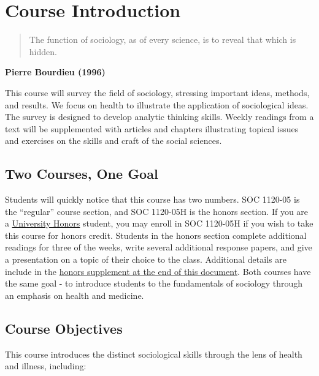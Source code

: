 \documentclass[]{book}
\theoremstyle{definition}
\theoremstyle{definition}
\theoremstyle{definition}
\theoremstyle{remark}
\begin{document}
\hypertarget{course-introduction}{%
\chapter{Course Introduction}\label{course-introduction}}

\begin{quote}
The function of sociology, as of every science, is to reveal that which
is hidden.
\end{quote}

\textbf{Pierre Bourdieu (1996)}

This course will survey the field of sociology, stressing important
ideas, methods, and results. We focus on health to illustrate the
application of sociological ideas. The survey is designed to develop
analytic thinking skills. Weekly readings from a text will be
supplemented with articles and chapters illustrating topical issues and
exercises on the skills and craft of the social sciences.

\hypertarget{two-courses-one-goal}{%
\section{Two Courses, One Goal}\label{two-courses-one-goal}}

Students will quickly notice that this course has two numbers. SOC
1120-05 is the ``regular'' course section, and SOC 1120-05H is the
honors section. If you are a
\href{https://www.slu.edu/honors/index.php}{University Honors} student,
you may enroll in SOC 1120-05H if you wish to take this course for
honors credit. Students in the honors section complete additional
readings for three of the weeks, write several additional response
papers, and give a presentation on a topic of their choice to the class.
Additional details are include in the
\href{/honors-overview.html}{honors supplement at the end of this
document}. Both courses have the same goal - to introduce students to
the fundamentals of sociology through an emphasis on health and
medicine.

\hypertarget{course-objectives}{%
\section{Course Objectives}\label{course-objectives}}

This course introduces the distinct sociological skills through the lens
of health and illness, including:
\end{document}
